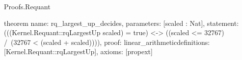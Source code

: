 \begin{lexlean}{Proofs.Requant}
\begin{semanticmodule}
theorem{
  name: rq_largest_up_decides,
  parameters: [scaled : Nat],
  statement: (((Kernel.Requant::rqLargestUp scaled) = true) <-> ((scaled <= 32767) /\ (32767 < (scaled + scaled)))),
  proof: linear_arithmetic{definitions: [Kernel.Requant::rqLargestUp]},
  axioms: [propext]
}
\end{semanticmodule}
\end{lexlean}
